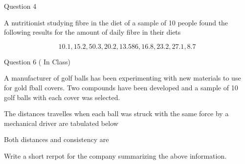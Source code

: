 

Question 4

A nutritionist studying fibre in the diet of a sample of 10 people found the following results for the amount of daily fibre in their diets

\[10.1,15.2,50.3,20.2,13.586,16.8,23.2,27.1,8.7\]

Question 6 ( In Class) 

A manufacturer of golf balls has been experimenting with new materials to use for gold fball covers.
Two compounds have been developed and a sample of 10 golf balls with each cover was selected.

The distances travelles when each ball was struck with the same force by a mechanical driver are tabulated below

Both distances and consistency are 

Write a short rerpot for the company summarizing the above information.

